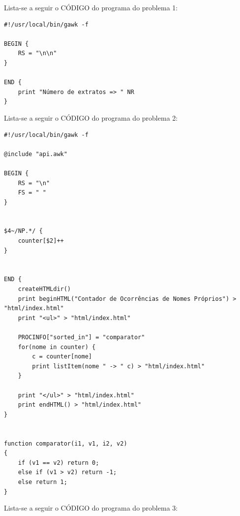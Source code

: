 \documentclass[11pt,a4paper]{report}%
\begin{document}
\newpage
Lista-se a seguir o CÓDIGO do programa do problema 1:
\begin{verbatim}
#!/usr/local/bin/gawk -f

BEGIN {
	RS = "\n\n"
}

END {
	print "Número de extratos => " NR
}
\end{verbatim}
\newpage
Lista-se a seguir o CÓDIGO do programa do problema 2:
\begin{verbatim}
#!/usr/local/bin/gawk -f

@include "api.awk"

BEGIN {
	RS = "\n"
	FS = " "
}


$4~/NP.*/ {
	counter[$2]++
}


END {
	createHTMLdir()
	print beginHTML("Contador de Ocorrências de Nomes Próprios") > "html/index.html"
	print "<ul>" > "html/index.html"
	
	PROCINFO["sorted_in"] = "comparator"
	for(nome in counter) {
		c = counter[nome]
		print listItem(nome " -> " c) > "html/index.html"
	}

	print "</ul>" > "html/index.html"
	print endHTML() > "html/index.html"
}


function comparator(i1, v1, i2, v2)
{
    if (v1 == v2) return 0;
    else if (v1 > v2) return -1;
    else return 1;
}
\end{verbatim}
\newpage
Lista-se a seguir o CÓDIGO do programa do problema 3:
\end{document}
